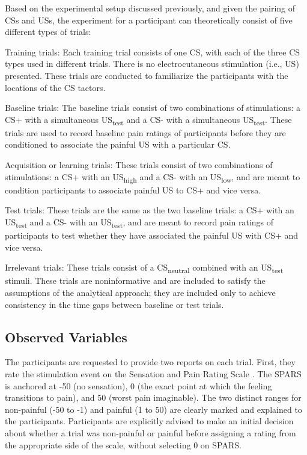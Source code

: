 \documentclass{article}
\begin{document}
Based on the experimental setup discussed previously, and given the pairing of CSs and USs, the experiment for a participant can theoretically consist of five different types of trials:

Training trials: Each training trial consists of one CS, with each of the three CS types used in different trials. There is no electrocutaneous stimulation (i.e., US) presented. These trials are conducted to familiarize the participants with the locations of the CS tactors. 

Baseline trials: The baseline trials consist of two combinations of stimulations: a CS+ with a simultaneous US\textsubscript{test} and a CS- with a simultaneous US\textsubscript{test}. These trials are used to record baseline pain ratings of participants before they are conditioned to associate the painful US with a particular CS.

Acquisition or learning trials: These trials consist of two combinations of stimulations: a CS+ with an US\textsubscript{high} and a CS- with an US\textsubscript{low}, and are meant to condition participants to associate painful US to CS+ and vice versa.

Test trials: These trials are the same as the two baseline trials: a CS+ with an US\textsubscript{test} and a CS- with an US\textsubscript{test}, and are meant to record pain ratings of participants to test whether they have associated the painful US with CS+ and vice versa.

Irrelevant trials: These trials consist of a CS\textsubscript{neutral} combined with an US\textsubscript{test} stimuli. These trials are noninformative and are included to satisfy the assumptions of the analytical approach; they are included only to achieve consistency in the time gaps between baseline or test trials. 

\subsection{Observed Variables}

The participants are requested to provide two reports on each trial. First, they rate the stimulation event on the Sensation and Pain Rating Scale \textcite[][SPARS; previously known as FESTNRS;]{Madden2017, Madden2019}. The SPARS is anchored at -50 (no sensation), 0 (the exact point at which the feeling transitions to pain), and 50 (worst pain imaginable). The two distinct ranges for non-painful (-50 to -1) and painful (1 to 50) are clearly marked and explained to the participants. Participants are explicitly advised to make an initial decision about whether a trial was non-painful or painful before assigning a rating from the appropriate side of the scale, without selecting 0 on SPARS. 
\end{document}
